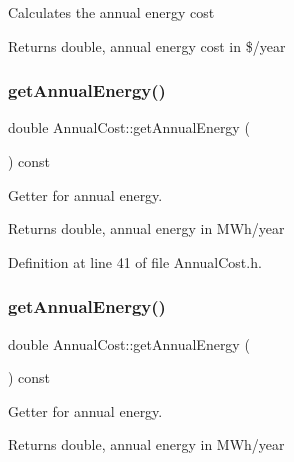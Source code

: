 Calculates the annual energy cost \begin{DoxyReturn}{Returns}
double, annual energy cost in \$/year 
\end{DoxyReturn}
\mbox{\label{class_annual_cost_a0e217b7df05e6a03503e14d96570a192}} 
\subsubsection{\texorpdfstring{get\+Annual\+Energy()}{getAnnualEnergy()}\hspace{0.1cm}{\footnotesize\ttfamily [1/3]}}
{\footnotesize\ttfamily double Annual\+Cost\+::get\+Annual\+Energy (\begin{DoxyParamCaption}{ }\end{DoxyParamCaption}) const\hspace{0.3cm}{\ttfamily [inline]}}

Getter for annual energy. \begin{DoxyReturn}{Returns}
double, annual energy in M\+Wh/year 
\end{DoxyReturn}


Definition at line 41 of file Annual\+Cost.\+h.

\mbox{\label{class_annual_cost_a0e217b7df05e6a03503e14d96570a192}} 
\subsubsection{\texorpdfstring{get\+Annual\+Energy()}{getAnnualEnergy()}\hspace{0.1cm}{\footnotesize\ttfamily [2/3]}}
{\footnotesize\ttfamily double Annual\+Cost\+::get\+Annual\+Energy (\begin{DoxyParamCaption}{ }\end{DoxyParamCaption}) const\hspace{0.3cm}{\ttfamily [inline]}}

Getter for annual energy. \begin{DoxyReturn}{Returns}
double, annual energy in M\+Wh/year 
\end{DoxyReturn}


